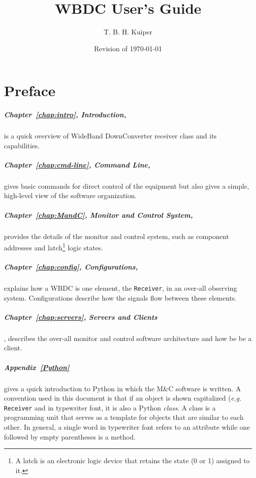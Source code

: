 \documentclass[letterpaper,11pt]{book}
\title{WBDC User's Guide}
\author{T. B. H. Kuiper}
\date{Revision of \today}
\begin{document}
\maketitle
\frontmatter
\chapter*{Preface}

\paragraph{Chapter~\ref{chap:intro}, Introduction,} is a quick overview of 
WideBand DownConverter receiver class and its capabilities.

\paragraph{Chapter~\ref{chap:cmd-line}, Command Line,} gives basic commands 
for direct 
control of the  equipment but also gives a simple, high-level view of the 
software organization.  

\paragraph{Chapter~\ref{chap:MandC}, Monitor and Control System,} provides the
details of the monitor and control system, such as component addresses and 
latch\footnote{A latch is an electronic logic device that retains the state
(0 or 1) assigned to it.} logic states.

\paragraph{Chapter~\ref{chap:config}, Configurations,} explains how a WBDC is 
one element,
the {\tt Receiver}, in an over-all observing system.  Configurations describe 
how the signals flow between these elements.

\paragraph{Chapter~\ref{chap:servers}, Servers and Clients}, describes the
over-all monitor and control software architecture and how be be a client.

\paragraph{Appendix~\ref{Python}} gives a quick introduction to Python in 
which the M\&C software is written. A convention used in this document is that 
if an object 
is shown capitalized ({\it e.g.} {\tt Receiver} and in typewriter font, it is
also a Python {\it class}. A class is a programming unit that serves as a 
template for objects that are similar to each other.  In general,
a single word in typewriter font refers to an attribute while one followed by
empty parentheses is a method.
\end{document}
